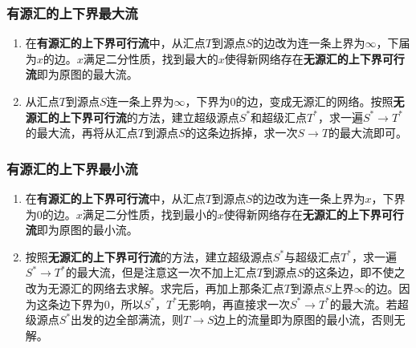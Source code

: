\documentclass[landscape, oneside, a4paper, cs4size]{book}
\begin{document}
\begin{multicols}{2}
\begin{spacing}{0.72}
\begin{spacing}{0.50}
\begin{spacing}{0.5}
						\subsubsection*{有源汇的上下界最大流}
						\begin{enumerate}
							\item 在\textbf{有源汇的上下界可行流}中，从汇点$T$到源点$S$的边改为连一条上界为$\infty$，下届为$x$的边。$x$满足二分性质，找到最大的$x$使得新网络存在\textbf{无源汇的上下界可行流}即为原图的最大流。
							\item 从汇点$T$到源点$S$连一条上界为$\infty$，下界为$0$的边，变成无源汇的网络。按照\textbf{无源汇的上下界可行流}的方法，建立超级源点$S^*$和超级汇点$T^*$，求一遍$S^* \rightarrow T^*$的最大流，再将从汇点$T$到源点$S$的这条边拆掉，求一次$S \rightarrow T$的最大流即可。
						\end{enumerate}
						\subsubsection*{有源汇的上下界最小流}
						\begin{enumerate}
							\item 在\textbf{有源汇的上下界可行流}中，从汇点$T$到源点$S$的边改为连一条上界为$x$，下界为$0$的边。$x$满足二分性质，找到最小的$x$使得新网络存在\textbf{无源汇的上下界可行流}即为原图的最小流。
							\item 按照\textbf{无源汇的上下界可行流}的方法，建立超级源点$S^*$与超级汇点$T^*$，求一遍$S^* \rightarrow T^*$的最大流，但是注意这一次不加上汇点$T$到源点$S$的这条边，即不使之改为无源汇的网络去求解。求完后，再加上那条汇点$T$到源点$S$上界$\infty$的边。因为这条边下界为$0$，所以$S^*$，$T^*$无影响，再直接求一次$S^* \rightarrow T^*$的最大流。若超级源点$S^*$出发的边全部满流，则$T \rightarrow S$边上的流量即为原图的最小流，否则无解。
						\end{enumerate}

\end{spacing}
\end{spacing}
\end{spacing}
\end{multicols}
\end{document}
